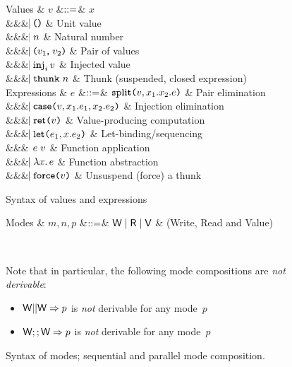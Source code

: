 \documentclass{llncs}
\begin{document}
\begin{figure}[htbp]
  \centering

\begin{grammar}
  Values
  & $v$
      &$\mathrel{::=}$&
      $x$
      \\ &&& $\bnfaltbrk \unitexp$ & Unit value
      \\ &&& $\hspace{-1.02ex}\mathrel{\mid} n$         & Natural number
      \\ &&& $\bnfaltbrk \Pair{v_1}{v_2}$ & Pair of values
      \\ &&& $\bnfaltbrk \inj{i}{v}$ & Injected value
      \\ &&& $\bnfaltbrk \thunk{n}$ & Thunk (suspended, closed expression)
  \\[1ex]
  Expressions
  & $e$
      &$\mathrel{::=}$&
             $\Split{v}{x_1}{x_2}{e}$ & Pair elimination
      \\ &&& $\bnfaltbrk \Case{v}{x_1}{e_1}{x_2}{e_2}$ & Injection elimination
      \\ &&& $\bnfaltbrk \Ret{v}$ & Value-producing computation
      \\ &&& $\bnfaltbrk \Let{e_1}{x}{e_2}$ & Let-binding/sequencing
      \\ &&& $\hspace{-1.02ex}\mathrel{\mid} e\;v$ & Function application
      \\ &&& $\hspace{-1.02ex}\mathrel{\mid} \lambda x.\, e$ & Function abstraction
      \\ &&& $\bnfaltbrk \Force{v}$ & Unsuspend (force) a thunk
\end{grammar}

  \caption{Syntax of values and expressions}
  \label{fig:expr}
\end{figure}


\begin{figure}[htbp]
{
  \centering

\begin{grammar}
  Modes & $m,n,p$ &$\mathrel{::=}$& $\textsf{W} \mathrel{\mid} \textsf{R} \mathrel{\mid} \textsf{V}$ & (Write, Read and Value) 
\end{grammar}

\\[2mm]
}
Note that in particular, the following mode compositions are \emph{not derivable}:
\begin{itemize}
\item $\textsf{W} || \textsf{W} => p$ is \emph{not} derivable for any mode~$p$
\item $\textsf{W} ;; \textsf{W} => p$ is \emph{not} derivable for any mode~$p$
\end{itemize}
\caption{Syntax of modes; sequential and parallel mode composition.}
\label{fig:expr}
\end{figure}
\end{document}
